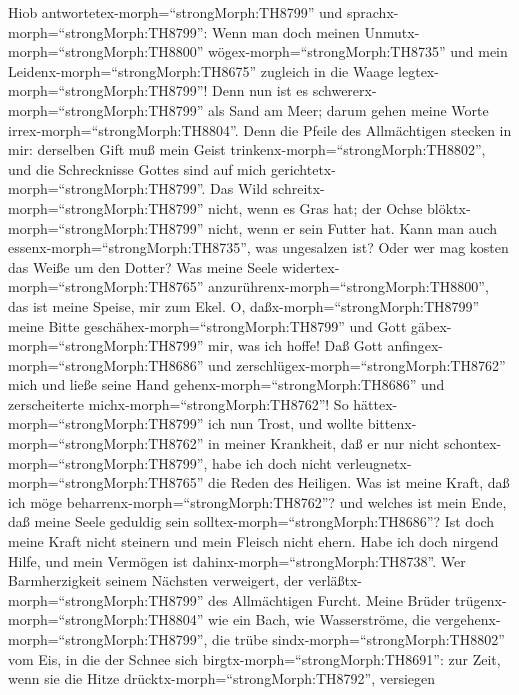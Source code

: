  Hiob antwortetex-morph=``strongMorph:TH8799'' und
sprachx-morph=``strongMorph:TH8799'':  Wenn man doch meinen
Unmutx-morph=``strongMorph:TH8800'' wögex-morph=``strongMorph:TH8735''
und mein Leidenx-morph=``strongMorph:TH8675'' zugleich in die Waage
legtex-morph=``strongMorph:TH8799''!  Denn nun ist es
schwererx-morph=``strongMorph:TH8799'' als Sand am Meer; darum gehen
meine Worte irrex-morph=``strongMorph:TH8804''.  Denn die
Pfeile des Allmächtigen stecken in mir: derselben Gift muß mein Geist
trinkenx-morph=``strongMorph:TH8802'', und die Schrecknisse Gottes sind
auf mich gerichtetx-morph=``strongMorph:TH8799''.  Das Wild
schreitx-morph=``strongMorph:TH8799'' nicht, wenn es Gras hat; der Ochse
blöktx-morph=``strongMorph:TH8799'' nicht, wenn er sein Futter hat.
 Kann man auch essenx-morph=``strongMorph:TH8735'', was
ungesalzen ist? Oder wer mag kosten das Weiße um den Dotter?
 Was meine Seele widertex-morph=``strongMorph:TH8765''
anzurührenx-morph=``strongMorph:TH8800'', das ist meine Speise, mir zum
Ekel.  O, daßx-morph=``strongMorph:TH8799'' meine Bitte
geschähex-morph=``strongMorph:TH8799'' und Gott
gäbex-morph=``strongMorph:TH8799'' mir, was ich hoffe!  Daß
Gott anfingex-morph=``strongMorph:TH8686'' und
zerschlügex-morph=``strongMorph:TH8762'' mich und ließe seine Hand
gehenx-morph=``strongMorph:TH8686'' und zerscheiterte
michx-morph=``strongMorph:TH8762''!  So
hättex-morph=``strongMorph:TH8799'' ich nun Trost, und wollte
bittenx-morph=``strongMorph:TH8762'' in meiner Krankheit, daß er nur
nicht schontex-morph=``strongMorph:TH8799'', habe ich doch nicht
verleugnetx-morph=``strongMorph:TH8765'' die Reden des Heiligen.
 Was ist meine Kraft, daß ich möge
beharrenx-morph=``strongMorph:TH8762''? und welches ist mein Ende, daß
meine Seele geduldig sein solltex-morph=``strongMorph:TH8686''?
 Ist doch meine Kraft nicht steinern und mein Fleisch nicht
ehern.  Habe ich doch nirgend Hilfe, und mein Vermögen ist
dahinx-morph=``strongMorph:TH8738''.  Wer Barmherzigkeit
seinem Nächsten verweigert, der verläßtx-morph=``strongMorph:TH8799''
des Allmächtigen Furcht.  Meine Brüder
trügenx-morph=``strongMorph:TH8804'' wie ein Bach, wie Wasserströme, die
vergehenx-morph=``strongMorph:TH8799'',  die trübe
sindx-morph=``strongMorph:TH8802'' vom Eis, in die der Schnee sich
birgtx-morph=``strongMorph:TH8691'':  zur Zeit, wenn sie
die Hitze drücktx-morph=``strongMorph:TH8792'', versiegen
